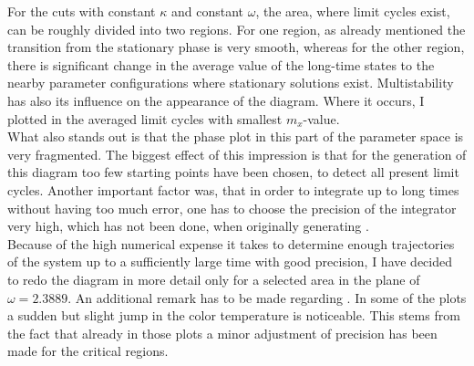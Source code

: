 For the cuts with constant $\kappa$ and constant $\omega$, the area, where limit cycles exist, can be roughly divided into two regions. For one region, as already mentioned the transition from the stationary phase is very smooth, whereas for the other region, there is significant change in the average value of the long-time states to the nearby parameter configurations where stationary solutions exist. Multistability has also its influence on the appearance of the diagram. Where it occurs, I plotted in  the averaged limit cycles with smallest $m_x$-value. \\What also stands out is that the phase plot in this part of the parameter space is very fragmented. The biggest effect of this impression is that for the generation of this diagram too few starting points have been chosen, to detect all present limit cycles. Another important factor was, that in order to integrate up to long times without having too much error, one has to choose the precision of the integrator very high, which has not been done, when originally generating . \\Because of the high numerical expense it takes to determine enough trajectories of the system up to a sufficiently large time with good precision, I have decided to redo the diagram in more detail only for a selected area in the plane of $\omega=2.3889$. An additional remark has to be made regarding . In some of the plots a sudden but slight jump in the color temperature is noticeable. This stems from the fact that already in those plots a minor adjustment of precision has been made for the critical regions. %
